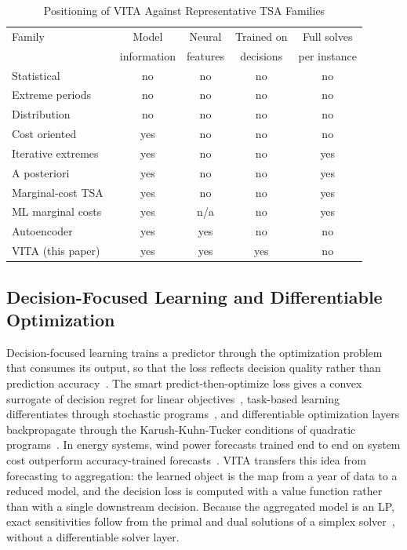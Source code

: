 \documentclass[journal]{IEEEtran}
\begin{document}
\begin{table}[!t]
\centering
\caption{Positioning of VITA Against Representative TSA Families\label{tab:positioning}}
\footnotesize
\setlength{\tabcolsep}{1.6pt}
\begin{tabular}{@{}lcccc@{}}
\toprule
Family & Model & Neural & Trained on & Full solves \\
 & information & features & decisions & per instance \\
\midrule
Statistical~\cite{kotzur2018impact,teichgraeber2019clustering} & no & no & no & no \\
Extreme periods~\cite{kotzur2018impact} & no & no & no & no \\
Distribution~\cite{hoffmann2022pareto} & no & no & no & no \\
Cost oriented~\cite{sun2019costoriented} & yes & no & no & no \\
Iterative extremes~\cite{teichgraeber2021iterative} & yes & no & no & yes \\
A posteriori~\cite{hilbers2023aposteriori} & yes & no & no & yes \\
Marginal-cost TSA~\cite{santosuosso2026marginal} & yes & no & no & yes \\
ML marginal costs~\cite{rybka2026mlexact} & yes & n/a & no & yes \\
Autoencoder~\cite{barbar2022autoencoder} & yes & yes & no & no \\
VITA (this paper) & yes & yes & yes & no \\
\bottomrule
\end{tabular}
\end{table}

\subsection{Decision-Focused Learning and Differentiable Optimization}
Decision-focused learning trains a predictor through the optimization problem that consumes its output, so that the loss reflects decision quality rather than prediction accuracy~\cite{mandi2024dfl}. The smart predict-then-optimize loss gives a convex surrogate of decision regret for linear objectives~\cite{elmachtoub2022spo}, task-based learning differentiates through stochastic programs~\cite{donti2017taskbased}, and differentiable optimization layers backpropagate through the Karush-Kuhn-Tucker conditions of quadratic programs~\cite{amos2017optnet}. In energy systems, wind power forecasts trained end to end on system cost outperform accuracy-trained forecasts~\cite{wahdany2023morethan}. VITA transfers this idea from forecasting to aggregation: the learned object is the map from a year of data to a reduced model, and the decision loss is computed with a value function rather than with a single downstream decision. Because the aggregated model is an LP, exact sensitivities follow from the primal and dual solutions of a simplex solver~\cite{huangfu2018highs}, without a differentiable solver layer.
\end{document}
